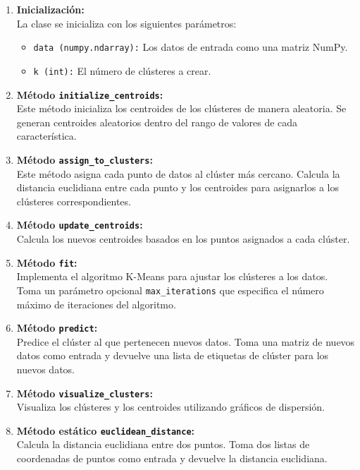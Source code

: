 \documentclass[conference]{IEEEtran}
\begin{document}
\begin{enumerate}
  \item \textbf{Inicialización:} \\
  La clase se inicializa con los siguientes parámetros:
  \begin{itemize}
    \item \texttt{data (numpy.ndarray):} Los datos de entrada como una matriz NumPy.
    \item \texttt{k (int):} El número de clústeres a crear.
  \end{itemize}

  \item \textbf{Método \texttt{initialize\_centroids}:} \\
  Este método inicializa los centroides de los clústeres de manera aleatoria. Se generan centroides aleatorios dentro del rango de valores de cada característica.

  \item \textbf{Método \texttt{assign\_to\_clusters}:} \\
  Este método asigna cada punto de datos al clúster más cercano. Calcula la distancia euclidiana entre cada punto y los centroides para asignarlos a los clústeres correspondientes.

  \item \textbf{Método \texttt{update\_centroids}:} \\
  Calcula los nuevos centroides basados en los puntos asignados a cada clúster.

  \item \textbf{Método \texttt{fit}:} \\
  Implementa el algoritmo K-Means para ajustar los clústeres a los datos. Toma un parámetro opcional \texttt{max\_iterations} que especifica el número máximo de iteraciones del algoritmo.

  \item \textbf{Método \texttt{predict}:} \\
  Predice el clúster al que pertenecen nuevos datos. Toma una matriz de nuevos datos como entrada y devuelve una lista de etiquetas de clúster para los nuevos datos.

  \item \textbf{Método \texttt{visualize\_clusters}:} \\
  Visualiza los clústeres y los centroides utilizando gráficos de dispersión.

  \item \textbf{Método estático \texttt{euclidean\_distance}:} \\
  Calcula la distancia euclidiana entre dos puntos. Toma dos listas de coordenadas de puntos como entrada y devuelve la distancia euclidiana.

\end{enumerate}
\end{document}
